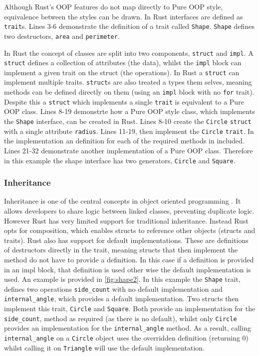 \documentclass[ oneside,%
                    author={James Elgar},
                    degree={MEng},
                     title={Bidirectional transformer between functional and \\ object-oriented programming in Rust},
                  subtitle={}]{dissertation}
\newcommand{\rust}[1]{\texttt{#1}}
\begin{document}
Although Rust's OOP features do not map directly to Pure OOP style, equivalence between the styles can be drawn. In Rust interfaces are defined as \rust{trait}s. Lines 3-6 demonstrate the definition of a trait called \rust{Shape}. \rust{Shape} defines two destructors, \rust{area} and \rust{perimeter}. 

In Rust the concept of classes are split into two components, \rust{struct} and \rust{impl}. A \rust{struct} defines a collection of attributes (the data), whilst the \rust{impl} block can implement a given trait on the struct (the operations). In Rust a \rust{struct} can implement multiple traits. \rust{struct}s are also treated a types them selves, meaning methods can be defined directly on them (using an \rust{impl} block with no \rust{for} trait). Despite this a \rust{struct} which implements a single \rust{trait} is equivalent to a Pure OOP class. 
Lines 8-19 demonstrte how a Pure OOP style class, which implements the \rust{Shape} interface, can be created in Rust. 
Lines 8-10 create the \rust{Circle} \rust{struct} with a single attribute \rust{radius}. Lines 11-19, then implement the \rust{Circle} \rust{trait}. In the implementation an definition for each of the required methods in included. 
Lines 21-32 demonstrate another implementation of a Pure OOP class. Therefore in this example the shape interface has two generators, \rust{Circle} and \rust{Square}.


\subsubsection{Inheritance}

Inheritance is one of the central concepts in object oriented programming \cite{cook_palsberg_1989}. It allows developers to share logic between linked classes, preventing duplicate logic. 
However Rust has very limited support for traditional inheritance. Instead Rust opts for composition, which enables structs to reference other objects (structs and traits).
Rust also has support for default implementations. These are definitions of destructors directly in the trait, meaning structs that then implement the method do not have to provide a definition. In this case if a definition is provided in an impl block, that definition is used other wise the default implementation is used.
An example is provided in \autoref{fig:shape2}. In this example the \rust{Shape} trait, defines two operations \rust{side_count} with no default implementation and \rust{internal_angle}, which provides a default implementation.
Two structs then implement this trait, \rust{Circle} and \rust{Square}. Both provide an implementation for the \rust{side_count}, method as required (as there is no default), whilst only \rust{Circle} provides an implementation for the \rust{internal_angle} method.
As a result, calling \rust{internal_angle} on a \rust{Circle} object uses the overridden definition (returning 0) whilst calling it on \rust{Triangle} will use the default implementation.
\end{document}

